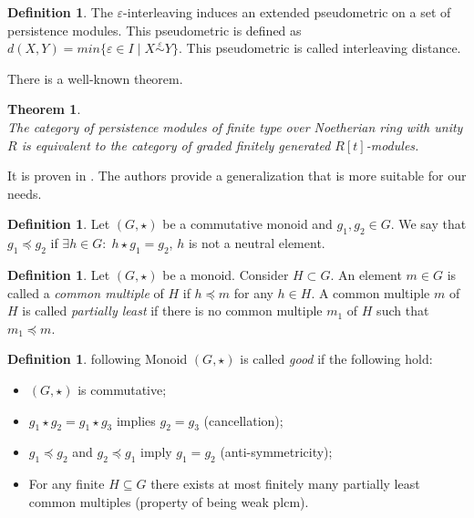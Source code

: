 \documentclass[english,12pt]{article}
\newcounter{stmcounter}[section]
\newcounter{thcounter}
\numberwithin{equation}{section}
\newtheorem{theorem}[thcounter]{Theorem}
\theoremstyle{definition}
\newtheorem{definition}[stmcounter]{Definition}
\theoremstyle{remark}
\newcommand{\define}[1]{{\textit{#1}}}
\begin{document}
\begin{definition}
  The $\varepsilon$-interleaving induces an extended pseudometric on a set of persistence modules. This pseudometric is defined as $d(X,Y) = min\{\varepsilon \in I\;|\;X \stackrel{\varepsilon}{\sim} Y\}$. This pseudometric is called interleaving distance. {\cite[Definition 2.12]{GS16}}\\
\end{definition}

There is a well-known theorem.

\begin{theorem} {\cite[Theorem 3.1]{Zomorodian05}}\\
  The category of persistence modules of finite type over Noetherian ring with unity $R$ is equivalent to the category of graded finitely generated $R[t]$-modules.
\end{theorem}

It is proven in {\cite{Corbet18}}. The authors provide a generalization that is more suitable for our needs.\\

\begin{definition}
  Let $(G,\star)$ be a commutative monoid and $g_1, g_2 \in G$.
  We say that $g_1 \preceq g_2$ if $\exists h \in G:\; h \star g_1 = g_2$, $h$ is not a neutral element.
\end{definition}

\begin{definition}
  Let $(G,\star)$ be a monoid. Consider $H \subset G$. An element $m \in G$ is called a \define{common multiple} of $H$ if $h \preceq m$ for any $h \in H$. A common multiple $m$ of $H$ is called \define{partially least} if there is no common multiple $m_1$ of $H$ such that $m_1 \preceq m$.
\end{definition}

\begin{definition} {following \cite[Definition 11]{Corbet18}}
  Monoid $(G,\star)$ is called \define{good} if the following hold:
  \begin{itemize}
    \item $(G, \star)$ is commutative;
    \item $g_1 \star g_2 = g_1 \star g_3$ implies $g_2 = g_3$ (cancellation);
    \item $g_1 \preceq g_2$ and $g_2 \preceq g_1$ imply $g_1 = g_2$ (anti-symmetricity);
    \item For any finite $H \subseteq G$ there exists at most finitely many partially least common multiples (property of being weak plcm).
  \end{itemize}
\end{definition}
\end{document}
